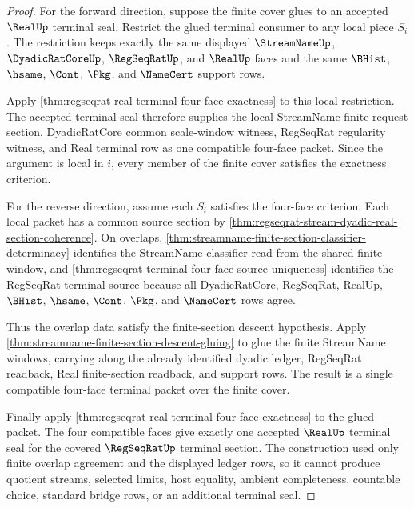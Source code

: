 \begin{proof}
For the forward direction, suppose the finite cover glues to an accepted
$\RealUp$ terminal seal. Restrict the glued terminal consumer to any local
piece $S_i$. The restriction keeps exactly the same displayed
$\StreamNameUp$, $\DyadicRatCoreUp$, $\RegSeqRatUp$, and $\RealUp$ faces and
the same $\BHist$, $\hsame$, $\Cont$, $\Pkg$, and $\NameCert$ support rows.

Apply \autoref{thm:regseqrat-real-terminal-four-face-exactness} to this local
restriction. The accepted terminal seal therefore supplies the local
StreamName finite-request section, DyadicRatCore common scale-window witness,
RegSeqRat regularity witness, and Real terminal row as one compatible
four-face packet. Since the argument is local in $i$, every member of the
finite cover satisfies the exactness criterion.

For the reverse direction, assume each $S_i$ satisfies the four-face
criterion. Each local packet has a common source section by
\autoref{thm:regseqrat-stream-dyadic-real-section-coherence}. On overlaps,
\autoref{thm:streamname-finite-section-classifier-determinacy} identifies the
StreamName classifier read from the shared finite window, and
\autoref{thm:regseqrat-terminal-four-face-source-uniqueness} identifies the
RegSeqRat terminal source because all DyadicRatCore, RegSeqRat, RealUp,
$\BHist$, $\hsame$, $\Cont$, $\Pkg$, and $\NameCert$ rows agree.

Thus the overlap data satisfy the finite-section descent hypothesis. Apply
\autoref{thm:streamname-finite-section-descent-gluing} to glue the finite
StreamName windows, carrying along the already identified dyadic ledger,
RegSeqRat readback, Real finite-section readback, and support rows. The result
is a single compatible four-face terminal packet over the finite cover.

Finally apply
\autoref{thm:regseqrat-real-terminal-four-face-exactness} to the glued packet.
The four compatible faces give exactly one accepted $\RealUp$ terminal seal
for the covered $\RegSeqRatUp$ terminal section. The construction used only
finite overlap agreement and the displayed ledger rows, so it cannot produce
quotient streams, selected limits, host equality, ambient completeness,
countable choice, standard bridge rows, or an additional terminal seal.
\end{proof}


